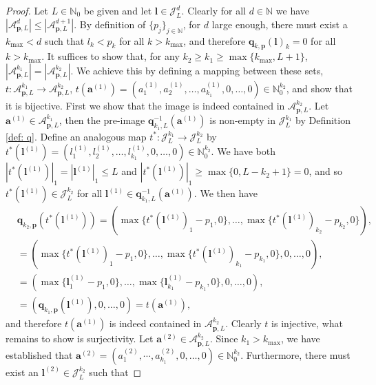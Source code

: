 \documentclass[pdflatex,sn-mathphys-num]{sn-jnl}%
\theoremstyle{thmstyleone}%
\theoremstyle{thmstyletwo}%
\theoremstyle{thmstylethree}%
\begin{document}
\begin{proof}

    Let \(L\in\mathbb{N}_0\) be given and let \(\boldsymbol{l}\in\mathcal{J}_L^d\). Clearly for all \(d\in\mathbb{N}\) we have \(|\mathcal{A}_{\mathbf{p},L}^d|\leq|\mathcal{A}_{\mathbf{p},L}^{d+1}|\). By definition of \(\{p_j\}_{j\in\mathbb{N}}\), for \(d\) large enough, there must exist a \(k_{\max}<d\) such that \(l_k<p_k\) for all \(k>k_{\max}\), and therefore \(\mathbf{q}_{k,\mathbf{p}}(\boldsymbol{l})_k=0\) for all \(k>k_{\max}\).  It suffices to show that, for any \(k_2\geq k_1\geq \max\{k_{\max},L+1\}\), \(|\mathcal{A}_{\mathbf{p},L}^{k_1}|=|\mathcal{A}_{\mathbf{p},L}^{k_2}|\). We achieve this by defining a mapping between these sets, \(t:\mathcal{A}_{\mathbf{p},L}^{k_1}\rightarrow \mathcal{A}_{\mathbf{p},L}^{k_2}\), \(t(\mathbf{a}^{(1)}) = (a^{(1)}_1,a^{(1)}_2,\dots,a^{(1)}_{k_1},0,\dots,0)\in\mathbb{N}_0^{k_2}\), and show that it is bijective. First we show that the image is indeed contained in \(\mathcal{A}_{\mathbf{p},L}^{k_2}\). Let \(\mathbf{a}^{(1)}\in\mathcal{A}_{\mathbf{p},L}^{k_1}\), then the pre-image \(\mathbf{q}_{k_1,L}^{-1}(\mathbf{a}^{(1)})\) is non-empty in \(\mathcal{J}_L^{k_1}\) by Definition \ref{def: q}. Define an analogous map \(t^*:\mathcal{J}_L^{k_1}\rightarrow\mathcal{J}_{L}^{k_2}\) by \(t^*(\boldsymbol{l}^{(1)})=(l^{(1)}_1,l^{(1)}_2,\dots,l^{(1)}_{k_1},0,\dots,0)\in\mathbb{N}_0^{k_2}\). We have both \(|t^*(\boldsymbol{l}^{(1)})|_1=|\boldsymbol{l}^{(1)}|_1\leq L\) and \(|t^*(\boldsymbol{l}^{(1)})|_1\geq\max\{0,L-k_2+1\}=0\), and so \(t^*(\boldsymbol{l}^{(1)})\in\mathcal{J}_{L}^{k_2}\) for all \(\boldsymbol{l}^{(1)}\in\mathbf{q}_{k_1,L}^{-1}(\mathbf{a}^{(1)})\). We then have 
    \begin{align}    
        &\mathbf{q}_{k_2,\mathbf{p}}(t^*(\boldsymbol{l}^{(1)}))=(\max\{t^*(\boldsymbol{l}^{(1)})_1-p_1,0\},\dots,\max\{t^*(\boldsymbol{l}^{(1)})_{k_2}-p_{k_2},0\}),\nonumber\\
        &=(\max\{t^*(\boldsymbol{l}^{(1)})_1-p_1,0\},\dots,\max\{t^*(\boldsymbol{l}^{(1)})_{k_1}-p_{k_1},0\},0,\dots,0),\nonumber\\
        &=(\max\{\boldsymbol{l}^{(1)}_1-p_1,0\},\dots,\max\{\boldsymbol{l}^{(1)}_{k_1}-p_{k_1},0\},0,\dots,0),\nonumber\\
        &=(\mathbf{q}_{k_1,\mathbf{p}}(\boldsymbol{l}^{(1)}),0,\dots,0)=t(\mathbf{a}^{(1)}),\nonumber
    \end{align}
    and therefore \(t(\mathbf{a}^{(1)})\) is indeed contained in \(\mathcal{A}_{\mathbf{p},L}^{k_2}\). Clearly \(t\) is injective, what remains to show is surjectivity. Let \(\mathbf{a}^{(2)}\in\mathcal{A}_{\mathbf{p},L}^{k_2}\). Since \(k_1>k_{\max}\), we have established that \(\mathbf{a}^{(2)}=(a_1^{(2)},\cdots,a_{k_1}^{(2)},0,\dots,0)\in\mathbb{N}_0^{k_2}\). Furthermore, there must exist an \(\boldsymbol{l}^{(2)}\in\mathcal{J}_{L}^{k_2}\) such that

\end{proof}
\end{document}
